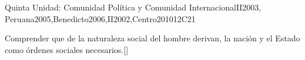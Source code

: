 \begin{syllabus}
\begin{unit}{}{Quinta Unidad: Comunidad Política y Comunidad Internacional}{II2003, Peruana2005,Benedicto2006,II2002,Centro2010}{12}{C21}
\begin{topics}
\end{topics}
\begin{learningoutcomes}
	\item Comprender que de la naturaleza social del hombre derivan, la nación y el Estado como órdenes sociales necesarios.[\Familiarity]
\end{learningoutcomes}
\end{unit}



\begin{coursebibliography}
\end{coursebibliography}

\end{syllabus}
